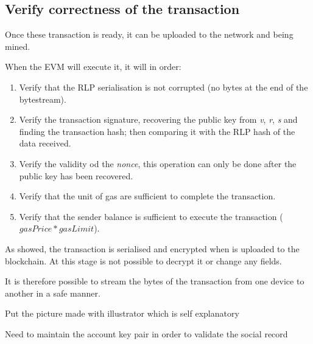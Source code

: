 \subsection{Verify correctness of the transaction}
Once these transaction is ready, it can be uploaded to the network and being mined.

When the EVM will execute it, it will in order:
\begin{enumerate}
  \item Verify that the RLP serialisation is not corrupted (no bytes at the end of the bytestream).
  \item Verify the transaction signature, recovering the public key from \textit{v}, \textit{r}, \textit{s} and finding the transaction hash; then comparing it with the RLP hash of the data received.
  \item Verify the validity od the \textit{nonce}, this operation can only be done after the public key has been recovered.
  \item Verify that the unit of gas are sufficient to complete the transaction.
  \item Verify that the sender balance is sufficient to execute the transaction ($gasPrice * gasLimit$).
\end{enumerate}

As showed, the transaction is serialised and encrypted when is uploaded to the blockchain.
At this stage is not possible to decrypt it or change any fields.

It is therefore possible to stream the bytes of the transaction from one device to another in a safe manner.

Put the picture made with illustrator which is self explanatory

\begin{notation}
  Need to maintain the account key pair in order to validate the social record
\end{notation}